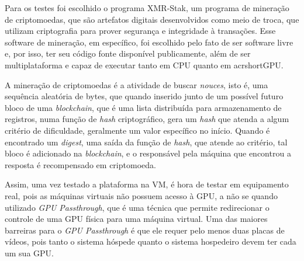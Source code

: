 Para os testes foi escolhido o programa XMR-Stak\cite{xmr_stak}, um programa de mineração de criptomoedas, que são artefatos digitais desenvolvidos como meio de troca, que utilizam criptografia para prover segurança e integridade à transações\cite{crypto_currencies}. Esse software de mineração, em específico, foi escolhido pelo fato de ser software livre e, por isso, ter seu código fonte disponível publicamente, além de ser multiplataforma e capaz de executar tanto em \acrshort{CPU} quanto em acrshort{GPU}.

A mineração de criptomoedas é a atividade de buscar \textit{nouces}, isto é, uma sequência aleatória de bytes, que quando inserido junto de um possível futuro bloco de uma \textit{blockchain}, que é uma lista distribuída para armazenamento de registros, numa função de \textit{hash} criptográfico, gera um \textit{hash} que atenda a algum critério de dificuldade, geralmente um valor específico no início. Quando é encontrado um \textit{digest}, uma saída da função de \textit{hash}, que atende ao critério, tal bloco é adicionado na \textit{blockchain}, e o responsável pela máquina que encontrou a resposta é recompensado em criptomoeda.

Assim, uma vez testado a plataforma na \acrshort{VM}, é hora de testar em equipamento real, pois as máquinas virtuais não possuem acesso à \acrshort{GPU}, a não se quando utilizado \textit{\acrshort{GPU} Passthrough}, que é uma técnica que permite redirecionar o controle de uma \acrshort{GPU} física para uma máquina virtual. Uma das maiores barreiras para o \textit{\acrshort{GPU} Passthrough} é que ele requer pelo menos duas placas de vídeos, pois tanto o sistema hóspede quanto o sistema hospedeiro devem ter cada um sua \acrshort{GPU}.


